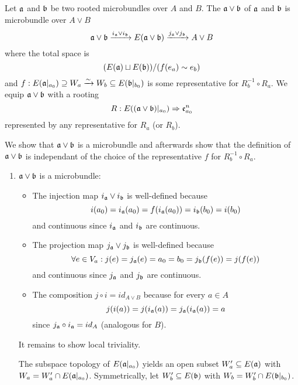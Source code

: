 \begin{mydefinition}
    Let $\mathfrak{a}$ and $\mathfrak{b}$ be two rooted microbundles over $A$ and $B$.
    The  $\mathfrak{a} \vee \mathfrak{b}$ of $\mathfrak{a}$ and $\mathfrak{b}$ is microbundle over $A \vee B$
    \[ \mathfrak{a} \vee \mathfrak{b} \xrightarrow{i_{\mathfrak{a}} \vee i_{\mathfrak{b}}} E(\mathfrak{a} \vee \mathfrak{b}) \xrightarrow{j_{\mathfrak{a}} \vee j_{\mathfrak{b}}} A \vee B \]
    where the total space is
    \[ (E(\mathfrak{a}) \sqcup E(\mathfrak{b})) / (f(e_a) \sim e_b) \]
    and $f: E(\mathfrak{a}\vert_{a_0}) \supseteq{} W_a \xrightarrow{\sim} W_b \subseteq{} E(\mathfrak{b}\vert_{b_0})$ is some representative for $R_b^{-1} \circ R_a$.
    We equip $\mathfrak{a} \vee \mathfrak{b}$ with a rooting
    \[ R: E((\mathfrak{a} \vee \mathfrak{b})\vert_{a_0}) \Rightarrow{} \mathfrak{e}^n_{a_0} \]
    represented by any representative for $R_a$ (or $R_b$).
\end{mydefinition}
\begin{myproof}
    We show that $\mathfrak{a} \vee \mathfrak{b}$ is a microbundle and afterwards show
    that the definition of $\mathfrak{a} \vee \mathfrak{b}$ is independant of the choice of the representative $f$ for $R_b^{-1} \circ R_a$.
    \begin{enumerate}
        \item $\mathfrak{a} \vee \mathfrak{b}$ is a microbundle:
        \begin{itemize}
            \item The injection map $i_{\mathfrak{a}} \vee i_{\mathfrak{b}}$ is well-defined because 
            \[ i(a_0) = i_{\mathfrak{a}}(a_0) = f(i_{\mathfrak{a}}(a_0)) = i_{\mathfrak{b}}(b_0) = i(b_0) \]
            and continuous since $i_{\mathfrak{a}}$ and $i_{\mathfrak{b}}$ are continuous.
            \item The projection map $j_{\mathfrak{a}} \vee j_{\mathfrak{b}}$ is well-defined because
            \[ \forall e \in V_a: j(e) = j_{\mathfrak{a}}(e) = a_0 = b_0 = j_{\mathfrak{b}}(f(e)) = j(f(e)) \]
            and continuous since $j_{\mathfrak{a}}$ and $j_{\mathfrak{b}}$ are continuous.
            \item The composition $j \circ i = id_{A \vee B}$ because for every $a \in A$
            \[ j(i(a)) = j(i_{\mathfrak{a}}(a)) = j_{\mathfrak{a}}(i_{\mathfrak{a}}(a)) = a \]
            since $j_{\mathfrak{a}} \circ i_{\mathfrak{a}} = id_A$ (analogous for $B$).
        \end{itemize}
        It remains to show local triviality.

        The subspace topology of $E(\mathfrak{a}\vert_{a_0})$ yields an open subset $W_a' \subseteq{} E(\mathfrak{a})$ with $W_a = W_a' \cap E(\mathfrak{a}\vert_{a_0})$.
        Symmetrically, let $W_b' \subseteq{} E(\mathfrak{b})$ with $W_b = W_b' \cap E(\mathfrak{b}\vert_{b_0})$.


\end{enumerate}
\end{myproof}

